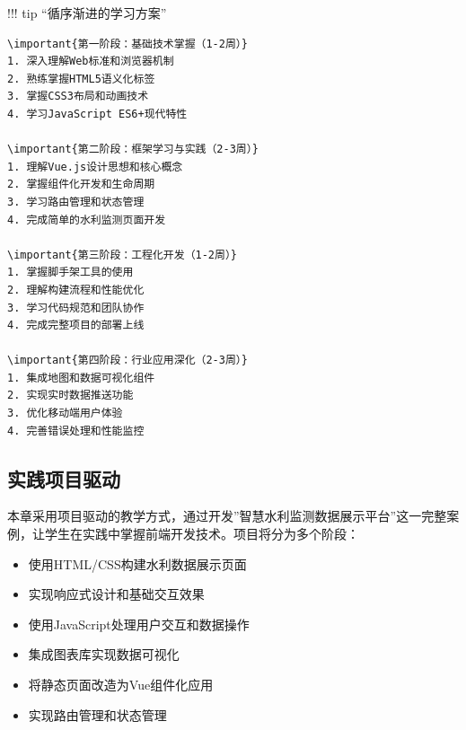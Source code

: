 !!! tip ``循序渐进的学习方案''

\begin{verbatim}
\important{第一阶段：基础技术掌握（1-2周）}
1. 深入理解Web标准和浏览器机制
2. 熟练掌握HTML5语义化标签
3. 掌握CSS3布局和动画技术
4. 学习JavaScript ES6+现代特性

\important{第二阶段：框架学习与实践（2-3周）}
1. 理解Vue.js设计思想和核心概念
2. 掌握组件化开发和生命周期
3. 学习路由管理和状态管理
4. 完成简单的水利监测页面开发

\important{第三阶段：工程化开发（1-2周）}
1. 掌握脚手架工具的使用
2. 理解构建流程和性能优化
3. 学习代码规范和团队协作
4. 完成完整项目的部署上线

\important{第四阶段：行业应用深化（2-3周）}
1. 集成地图和数据可视化组件
2. 实现实时数据推送功能
3. 优化移动端用户体验
4. 完善错误处理和性能监控
\end{verbatim}

\hypertarget{ux5b9eux8df5ux9879ux76eeux9a71ux52a8}{%
\subsection{实践项目驱动}\label{ux5b9eux8df5ux9879ux76eeux9a71ux52a8}}

本章采用项目驱动的教学方式，通过开发''智慧水利监测数据展示平台''这一完整案例，让学生在实践中掌握前端开发技术。项目将分为多个阶段：


\begin{itemize}
\tightlist
\item
  使用HTML/CSS构建水利数据展示页面
\item
  实现响应式设计和基础交互效果
\end{itemize}


\begin{itemize}
\tightlist
\item
  使用JavaScript处理用户交互和数据操作
\item
  集成图表库实现数据可视化
\end{itemize}


\begin{itemize}
\tightlist
\item
  将静态页面改造为Vue组件化应用
\item
  实现路由管理和状态管理
\end{itemize}

